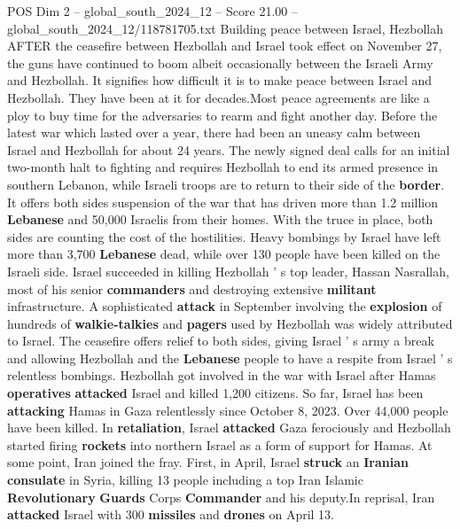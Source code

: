 \begin{textsample}{POS Dim 2 – global\_south\_2024\_12 – Score 21.00 – global\_south\_2024\_12/118781705.txt}  \label{ex:f2_pos_203}
Building peace between Israel, Hezbollah AFTER the ceasefire between Hezbollah and Israel took effect on November 27, the guns have continued to boom albeit occasionally between the Israeli Army and Hezbollah.
It signifies how difficult it is to make peace between Israel and Hezbollah.
They have been at it for decades.Most peace agreements are like a ploy to buy time for the adversaries to rearm and fight another day.
Before the latest war which lasted over a year, there had been an uneasy calm between Israel and Hezbollah for about 24 years.
The newly signed deal calls for an initial two-month halt to fighting and requires Hezbollah to end its armed presence in southern Lebanon, while Israeli troops are to return to their side of the \textbf{border}.
It offers both sides suspension of the war that has driven more than 1.2 million \textbf{Lebanese} and 50,000 Israelis from their homes.
With the truce in place, both sides are counting the cost of the hostilities.
Heavy bombings by Israel have left more than 3,700 \textbf{Lebanese} dead, while over 130 people have been killed on the Israeli side.
Israel succeeded in killing Hezbollah ' s top leader, Hassan Nasrallah, most of his senior \textbf{commanders} and destroying extensive \textbf{militant} infrastructure.
A sophisticated \textbf{attack} in September involving the \textbf{explosion} of hundreds of \textbf{walkie-talkies} and \textbf{pagers} used by Hezbollah was widely attributed to Israel.
The ceasefire offers relief to both sides, giving Israel ' s army a break and allowing Hezbollah and the \textbf{Lebanese} people to have a respite from Israel ' s relentless bombings.
Hezbollah got involved in the war with Israel after Hamas \textbf{operatives} \textbf{attacked} Israel and killed 1,200 citizens.
So far, Israel has been \textbf{attacking} Hamas in Gaza relentlessly since October 8, 2023.
Over 44,000 people have been killed.
In \textbf{retaliation}, Israel \textbf{attacked} Gaza ferociously and Hezbollah started firing \textbf{rockets} into northern Israel as a form of support for Hamas.
At some point, Iran joined the fray.
First, in April, Israel \textbf{struck} an \textbf{Iranian} \textbf{consulate} in Syria, killing 13 people including a top Iran Islamic \textbf{Revolutionary} \textbf{Guards} Corps \textbf{Commander} and his deputy.In reprisal, Iran \textbf{attacked} Israel with 300 \textbf{missiles} and \textbf{drones} on April 13.

\end{textsample}
